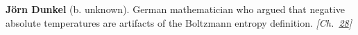 \textbf{Jörn Dunkel} (b. unknown). German mathematician who argued that negative absolute temperatures are artifacts of the Boltzmann entropy definition. \emph{[Ch.~\hyperref[ch:negativetemperature]{28}]}

